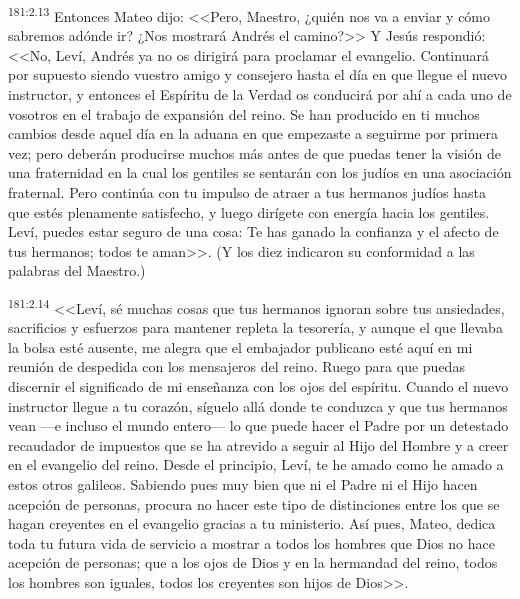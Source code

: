 \par 
\textsuperscript{181:2.13} Entonces Mateo dijo: <<Pero, Maestro, ¿quién nos va a enviar y cómo sabremos adónde ir? ¿Nos mostrará Andrés el camino?>> Y Jesús respondió: <<No, Leví, Andrés ya no os dirigirá para proclamar el evangelio. Continuará por supuesto siendo vuestro amigo y consejero hasta el día en que llegue el nuevo instructor, y entonces el Espíritu de la Verdad os conducirá por ahí a cada uno de vosotros en el trabajo de expansión del reino. Se han producido en ti muchos cambios desde aquel día en la aduana en que empezaste a seguirme por primera vez; pero deberán producirse muchos más antes de que puedas tener la visión de una fraternidad en la cual los gentiles se sentarán con los judíos en una asociación fraternal. Pero continúa con tu impulso de atraer a tus hermanos judíos hasta que estés plenamente satisfecho, y luego dirígete con energía hacia los gentiles. Leví, puedes estar seguro de una cosa: Te has ganado la confianza y el afecto de tus hermanos; todos te aman>>. (Y los diez indicaron su conformidad a las palabras del Maestro.)

\par 
\textsuperscript{181:2.14} <<Leví, sé muchas cosas que tus hermanos ignoran sobre tus ansiedades, sacrificios y esfuerzos para mantener repleta la tesorería, y aunque el que llevaba la bolsa esté ausente, me alegra que el embajador publicano esté aquí en mi reunión de despedida con los mensajeros del reino. Ruego para que puedas discernir el significado de mi enseñanza con los ojos del espíritu. Cuando el nuevo instructor llegue a tu corazón, síguelo allá donde te conduzca y que tus hermanos vean ---e incluso el mundo entero--- lo que puede hacer el Padre por un detestado recaudador de impuestos que se ha atrevido a seguir al Hijo del Hombre y a creer en el evangelio del reino. Desde el principio, Leví, te he amado como he amado a estos otros galileos. Sabiendo pues muy bien que ni el Padre ni el Hijo hacen acepción de personas, procura no hacer este tipo de distinciones entre los que se hagan creyentes en el evangelio gracias a tu ministerio. Así pues, Mateo, dedica toda tu futura vida de servicio a mostrar a todos los hombres que Dios no hace acepción de personas; que a los ojos de Dios y en la hermandad del reino, todos los hombres son iguales, todos los creyentes son hijos de Dios>>.

